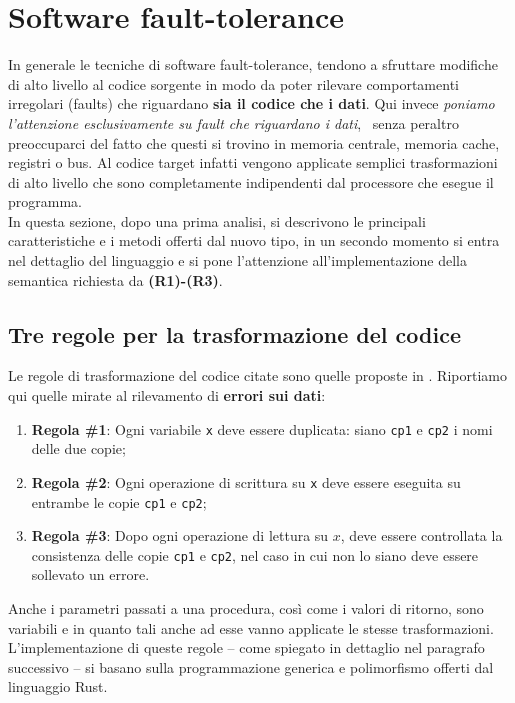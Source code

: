\section{Software fault-tolerance} \label{sec:hardened}
In generale le tecniche di software fault-tolerance, tendono a sfruttare modifiche di alto livello al codice sorgente in modo da poter rilevare comportamenti irregolari (faults) che riguardano \textbf{sia il codice che i dati}. Qui invece \textit{poniamo l’attenzione esclusivamente su fault che riguardano i dati},  senza peraltro preoccuparci del fatto che questi si trovino in memoria centrale, memoria cache, registri o bus. Al codice target infatti vengono applicate semplici trasformazioni di alto livello che sono completamente indipendenti dal processore che esegue il programma. \\
In questa sezione, dopo una prima analisi, si descrivono le principali caratteristiche e i metodi offerti dal nuovo tipo, in un secondo momento si entra nel dettaglio del linguaggio e si pone l'attenzione all'implementazione della semantica richiesta da \textbf{(R1)-(R3)}.
\subsection{Tre regole per la trasformazione del codice}
Le regole di trasformazione del codice citate sono quelle proposte in \cite{802887}. Riportiamo qui quelle mirate al rilevamento di \textbf{errori sui dati}:
\begin{enumerate}
    \itemsep-0.2em
    \item \textbf{Regola \#1}: Ogni variabile \texttt{x} deve essere duplicata: siano \texttt{cp1} e \texttt{cp2} i nomi delle due copie;
    \item \textbf{Regola \#2}: Ogni operazione di scrittura su \texttt{x} deve essere eseguita su entrambe le copie \texttt{cp1} e \texttt{cp2};
    \item \textbf{Regola \#3}: Dopo ogni operazione di lettura su $x$, deve essere controllata la consistenza delle copie \texttt{cp1} e \texttt{cp2}, nel caso in cui non lo siano deve essere sollevato un errore.
\end{enumerate}
Anche i parametri passati a una procedura, così come i valori di ritorno, sono variabili e in quanto tali anche ad esse vanno applicate le stesse trasformazioni. L'implementazione di queste regole -- come spiegato in dettaglio nel paragrafo successivo -- si basano sulla programmazione generica e polimorfismo offerti dal linguaggio Rust. 

